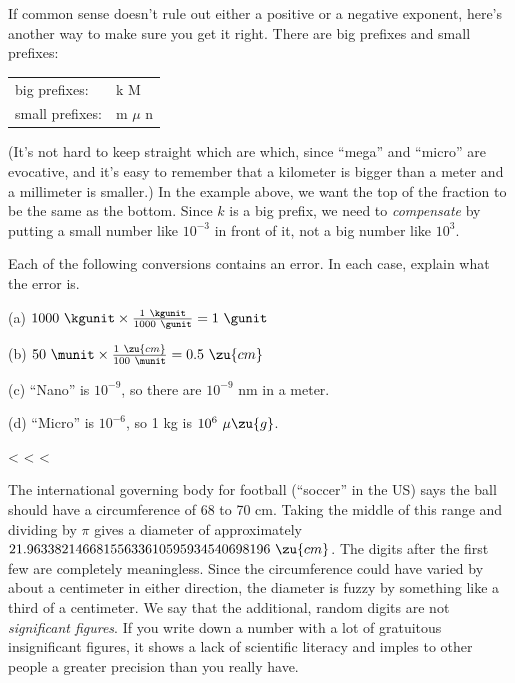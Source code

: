 If common sense doesn't rule out either a positive or a
negative exponent, here's another way to make sure you get
it right. There are big prefixes and small prefixes:

\begin{tabular}{ll}
    big prefixes:    & k \quad    M \\
    small prefixes:  &  m  \quad  $\mu$  \quad   n \\
\end{tabular}

\noindent (It's not hard to keep straight which are which, since
``mega'' and ``micro'' are evocative, and it's easy to
remember that a kilometer is bigger than a meter and a
millimeter is smaller.) In the example above, we want the
top of the fraction to be the same as the bottom. Since $k$
is a big prefix, we need to \emph{compensate} by putting a
small number like $10^{-3}$  in front of it, not a big
number like $10^3$.



\startdq

\begin{dq}
Each of the following conversions contains an error.  In
each case, explain what the error is.

(a) $1000\ \kgunit \times \frac{1\ \kgunit}{1000\ \gunit}  = 1\ \gunit$

(b) $50\ \munit \times \frac{1\ \zu{cm}}{100\ \munit}    =  0.5\ \zu{cm}$

(c) ``Nano'' is $10^{-9}$, so there are $10^{-9}$  nm in a meter.

(d) ``Micro'' is $10^{-6}$, so 1 kg is $10^6\ \mu\zu{g}$.

\end{dq}

<%
<%
<%

The international governing body for football (``soccer'' in the US) says
the ball should have a circumference of 68 to 70 cm. Taking the middle of
this range and dividing by $\pi$ gives a diameter of approximately
$21.96338214668155633610595934540698196\ \zu{cm}$.
The digits after the first few are completely meaningless. Since the
circumference could have varied by about a centimeter in either direction,
the diameter is fuzzy by something like a third of a centimeter. We say that
the additional, random digits are not \emph{significant figures}.
If you write down a number with a lot of gratuitous insignificant figures,
it shows a lack of scientific literacy and imples to other people a greater
precision than you really have.

